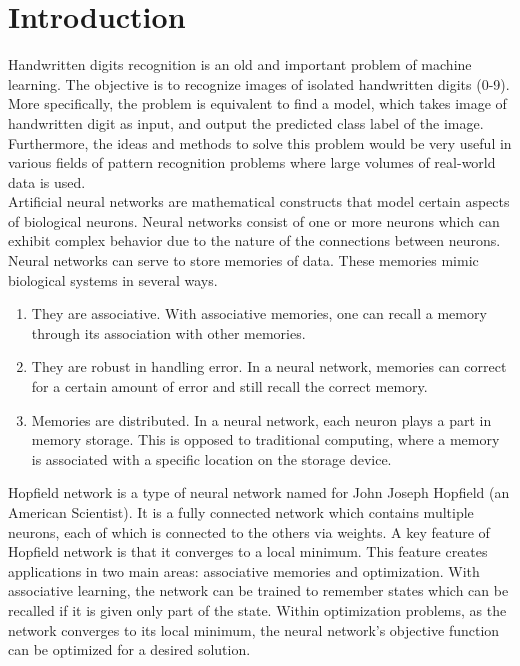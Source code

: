 \section{Introduction}

Handwritten digits recognition is an old and important problem of machine learning. The objective is to recognize images of isolated handwritten digits (0-9). More
specifically, the problem is equivalent to find a model, which takes image of handwritten digit as input, and output the predicted class label of the image.
Furthermore, the ideas and methods to solve this problem would be very useful in various fields of pattern recognition problems where large volumes of real-world data is used.\\

Artificial neural networks are mathematical constructs that model certain aspects of biological neurons. Neural networks consist of one or more neurons which can exhibit complex behavior due to the nature of the connections between neurons. Neural networks can serve to store memories of data. These memories mimic biological systems in several ways.
\begin{enumerate}
	\item They are associative. With associative memories, one can recall a memory through its association with other memories.
	\item They are robust in handling error. In a neural network, memories can correct for a certain amount of error and still recall the correct memory.
	\item Memories are distributed. In a neural network, each neuron plays a part in memory storage. This is opposed to traditional computing, where a memory is associated with a specific location on the storage device.
\end{enumerate}

Hopfield network is a type of neural network named for John Joseph Hopfield (an American Scientist). It is a fully connected network which contains multiple neurons, each of which is connected to the others via weights. A key feature of Hopfield network is that it converges to a local minimum. This feature creates applications in two main areas: associative memories and optimization. With associative learning, the network can be trained to remember states which can be recalled if it is given only part of the state. Within optimization problems, as the network converges to its local minimum, the neural network's objective function can be optimized for a desired solution.